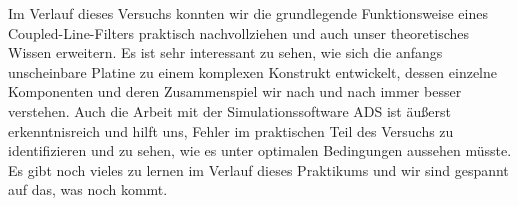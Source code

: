 Im Verlauf dieses Versuchs konnten wir die grundlegende Funktionsweise eines Coupled-Line-Filters praktisch nachvollziehen und auch unser theoretisches Wissen erweitern. 
Es ist sehr interessant zu sehen, wie sich die anfangs unscheinbare Platine zu einem komplexen Konstrukt entwickelt, dessen einzelne Komponenten und deren Zusammenspiel wir nach und nach immer besser verstehen. 
Auch die Arbeit mit der Simulationssoftware ADS ist äußerst erkenntnisreich und hilft uns, Fehler im praktischen Teil des Versuchs zu identifizieren und zu sehen, wie es unter optimalen Bedingungen aussehen müsste. 
Es gibt noch vieles zu lernen im Verlauf dieses Praktikums und wir sind gespannt auf das, was noch kommt.
\clearpage